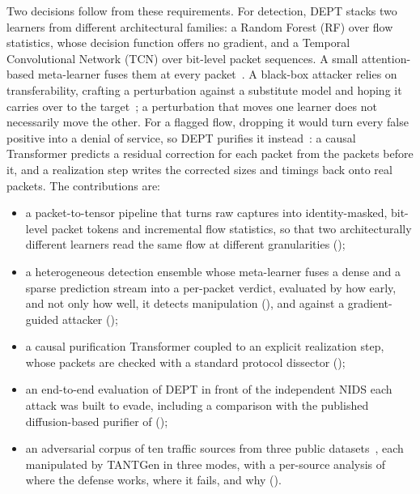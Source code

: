 \documentclass[acmtog,nonacm,pbalance]{acmart}
\begin{document}
Two decisions follow from these requirements. For detection, DEPT stacks two
learners from different architectural families: a Random Forest (RF) over flow
statistics, whose decision function offers no gradient, and a Temporal
Convolutional Network (TCN) over bit-level packet sequences. A small
attention-based meta-learner fuses them at every
packet~\cite{wolpert1992stacked}. A black-box attacker relies on
transferability, crafting a perturbation against a substitute model and hoping
it carries over to the target~\cite{papernot2017practical}; a perturbation that
moves one learner does not necessarily move the other. For a flagged flow, dropping it
would turn every false positive into a denial of service, so DEPT purifies it
instead~\cite{samangouei2018defense}: a causal Transformer predicts a residual
correction for each packet from the packets before it, and a realization step
writes the corrected sizes and timings back onto real packets. The
contributions are:
\begin{itemize}
  \item a packet-to-tensor pipeline that turns raw captures into
  identity-masked, bit-level packet tokens and incremental flow statistics, so
  that two architecturally different learners read the same flow at different
  granularities ();
  \item a heterogeneous detection ensemble whose meta-learner fuses a dense and
  a sparse prediction stream into a per-packet verdict, evaluated by how early,
  and not only how well, it detects manipulation (),
  and against a gradient-guided attacker ();
  \item a causal purification Transformer coupled to an explicit realization
  step, whose packets are checked with a standard protocol dissector
  ();
  \item an end-to-end evaluation of DEPT in front of the independent NIDS each
  attack was built to evade, including a comparison with the published
  diffusion-based purifier of \citet{merzouk2024diffusion}
  ();
  \item an adversarial corpus of ten traffic sources from three public
  datasets~\cite{mirsky2018kitsune,sharafaldin2018cicids,sharafaldin2019cicddos}, each
  manipulated by TANTGen in three modes, with a per-source analysis of where the
  defense works, where it fails, and why ().
\end{itemize}
\end{document}
